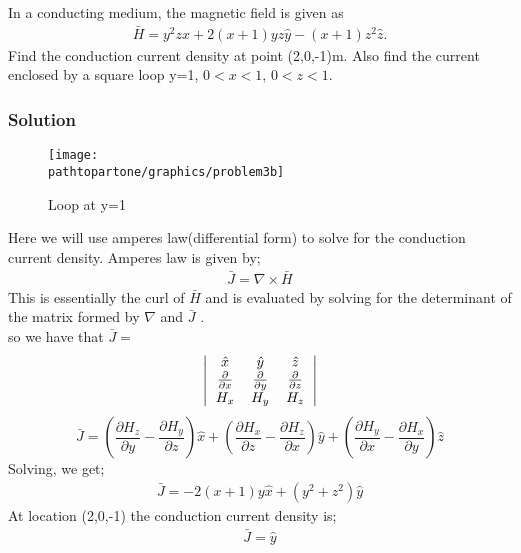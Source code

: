 \begin{exmp}
	In a conducting medium, the magnetic field is given as
	\begin{align*}
			\bar{H}=y^{2}z\hat{x}+2(x+1)yz\hat{y}-(x+1)z^{2}\hat{z}.
		\end{align*}
	Find the conduction current density at point (2,0,-1)m. Also find the current enclosed by a square loop y=1, $0<x<1$, $0<z<1$.
	\subsubsection*{Solution}
	\begin{figure}[h]
			\centering
			\texttt{[image: \\pathtopartone/graphics/problem3b]}
			\caption{Loop at y=1}
		\end{figure} 
	
	Here we will use amperes law(differential form) to solve for the conduction current density. Amperes law is given by;
	\begin{align*}
			\bar{J}=\nabla\times\bar{H}
		\end{align*}
	This is essentially the curl of $\bar{H}$ and is evaluated by solving for the determinant of the matrix formed by $\nabla$ and $\bar{J}$ .\\
	so we have that $\bar{J} =$
	\[
	\left|
	\begin{tabular}{c c c}
			$\hat{x}$ & $\hat{y}$ & $\hat{z}$\\
			$\frac{\partial}{\partial x}$ & $\frac{\partial}{\partial y}$ & $\frac{\partial}{\partial z}$\\
			$H_{x}$ & $H_{y}$ & $H_{z}$
		\end{tabular}
	\right|
	\]
	\begin{dmath*}
			\bar{J}= (\frac{\partial H_{z}}{\partial y}-\frac{\partial H_{y}}{\partial z})\hat{x}+ (\frac{\partial H_{x}}{\partial z}-\frac{\partial H_{z}}{\partial x})\hat{y}+ (\frac{\partial H_{y}}{\partial x}-\frac{\partial H_{x}}{\partial y})\hat{z}
		\end{dmath*}
	Solving, we get;
	\begin{align*}
			\bar{J}=-2(x+1)y\hat{x}+(y^{2}+z^{2})\hat{y}
		\end{align*}
	At location (2,0,-1) the conduction current density is;
	\begin{align*}
			\bar{J}=\hat{y}
		\end{align*}
	

\end{exmp}
